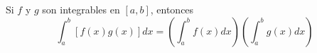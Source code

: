 \item Si $f$ y $g$ son integrables en $[a, b]$, entonces
$$\int_a^b [f(x)g(x)] dx = \left( \int_a^b f(x) dx \right) \left( \int_a^b g(x) dx \right)$$
